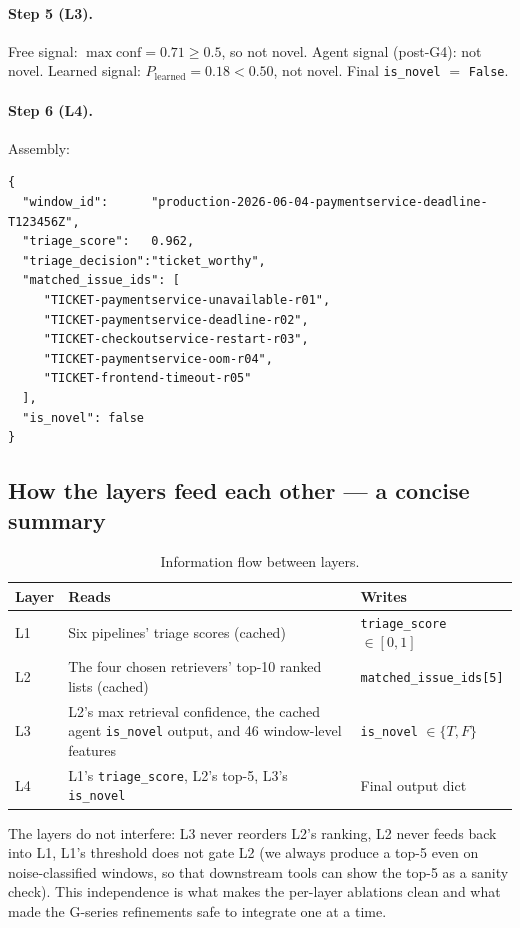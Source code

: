 \paragraph{Step 5 (L3).} Free signal: $\max \text{conf} = 0.71 \geq 0.5$, so not novel. Agent signal (post-G4): not novel. Learned signal: $P_{\text{learned}} = 0.18 < 0.50$, not novel. Final \texttt{is\_novel} $= $ \texttt{False}.

\paragraph{Step 6 (L4).} Assembly:
\begin{lstlisting}[basicstyle=\ttfamily\scriptsize]
{
  "window_id":      "production-2026-06-04-paymentservice-deadline-T123456Z",
  "triage_score":   0.962,
  "triage_decision":"ticket_worthy",
  "matched_issue_ids": [
     "TICKET-paymentservice-unavailable-r01",
     "TICKET-paymentservice-deadline-r02",
     "TICKET-checkoutservice-restart-r03",
     "TICKET-paymentservice-oom-r04",
     "TICKET-frontend-timeout-r05"
  ],
  "is_novel": false
}
\end{lstlisting}

\subsection{How the layers feed each other --- a concise summary}

\begin{table}[h]
\centering
\caption{Information flow between layers.}
\label{tab:layer-flow}
\small
\begin{tabularx}{\linewidth}{l X X}
\toprule
Layer & Reads & Writes \\
\midrule
L1 & Six pipelines' triage scores (cached) & \texttt{triage\_score} $\in [0,1]$ \\
L2 & The four chosen retrievers' top-10 ranked lists (cached) & \texttt{matched\_issue\_ids[5]} \\
L3 & L2's max retrieval confidence, the cached agent \texttt{is\_novel} output, and 46 window-level features & \texttt{is\_novel} $\in \{T, F\}$ \\
L4 & L1's \texttt{triage\_score}, L2's top-5, L3's \texttt{is\_novel} & Final output dict \\
\bottomrule
\end{tabularx}
\end{table}

The layers do not interfere: L3 never reorders L2's ranking, L2 never feeds back into L1, L1's threshold does not gate L2 (we always produce a top-5 even on noise-classified windows, so that downstream tools can show the top-5 as a sanity check). This independence is what makes the per-layer ablations clean and what made the G-series refinements safe to integrate one at a time.
